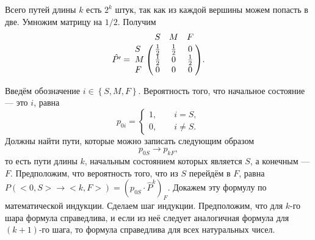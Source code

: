 Всего путей длины $k$ есть $2^k$ штук, так как из каждой вершины можем попасть в две.
Умножим матрицу на $1/2$.
Получим
$$ \hat{P'} =
\bordermatrix{~ & S & M & F \cr
              S & \frac{1}{2} & \frac{1}{2} & 0 \cr
              M & \frac{1}{2} & 0 & \frac{1}{2} \cr
	      F & 0 & 0 & 0 \cr }.$$

Введём обозначение $i \in \left\{ S, M ,F \right\} $.
Вероятность того, что начальное состояние --- это $i$, равна
$$p_{0i} =
\begin{cases}
1, \qquad i = S, \\
0, \qquad i \neq S.
\end{cases}$$
Должны найти пути,
которые можно записать следующим образом
$$p_{0S} \rightarrow p_{kF},$$
то есть пути длины $k$, начальным состоянием которых является $S$, а конечным --- $F$.
Предположим, что вероятность того, что из $S$ перейдём в $F$, равна $P \left( <0, S> \rightarrow <k, F> \right) = \left( p_{0S} \cdot \hat{P}^k \right)_F$.
Докажем эту формулу по математической индукции.
Сделаем шаг индукции.
Предположим,
что для $k$-го шара формула справедлива,
и если из неё следует аналогичная формула для $ \left( k+1 \right) $-го шага, то формула справедлива для всех натуральных чисел.

